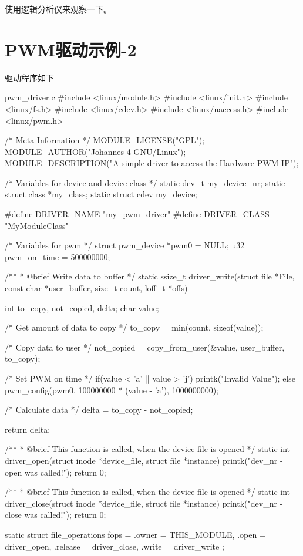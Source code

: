 \documentclass[lang=cn,newtx,10pt,scheme=chinese]{elegantbook}
\begin{document}
使用逻辑分析仪来观察一下。

\chapter{PWM驱动示例-2}

驱动程序如下

\begin{mycode}{pwm\_driver.c}
#include <linux/module.h>
#include <linux/init.h>
#include <linux/fs.h>
#include <linux/cdev.h>
#include <linux/uaccess.h>
#include <linux/pwm.h>

/* Meta Information */
MODULE_LICENSE("GPL");
MODULE_AUTHOR("Johannes 4 GNU/Linux");
MODULE_DESCRIPTION("A simple driver to access the Hardware PWM IP");

/* Variables for device and device class */
static dev_t my_device_nr;
static struct class *my_class;
static struct cdev my_device;

#define DRIVER_NAME "my_pwm_driver"
#define DRIVER_CLASS "MyModuleClass"

/* Variables for pwm  */
struct pwm_device *pwm0 = NULL;
u32 pwm_on_time = 500000000;

/**
 * @brief Write data to buffer
 */
static ssize_t driver_write(struct file *File, const char *user_buffer, size_t count, loff_t *offs) {
    int to_copy, not_copied, delta;
    char value;

    /* Get amount of data to copy */
    to_copy = min(count, sizeof(value));

    /* Copy data to user */
    not_copied = copy_from_user(&value, user_buffer, to_copy);

    /* Set PWM on time */
    if(value < 'a' || value > 'j')
        printk("Invalid Value\n");
    else
        pwm_config(pwm0, 100000000 * (value - 'a'), 1000000000);

    /* Calculate data */
    delta = to_copy - not_copied;

    return delta;
}

/**
 * @brief This function is called, when the device file is opened
 */
static int driver_open(struct inode *device_file, struct file *instance) {
    printk("dev_nr - open was called!\n");
    return 0;
}

/**
 * @brief This function is called, when the device file is opened
 */
static int driver_close(struct inode *device_file, struct file *instance) {
    printk("dev_nr - close was called!\n");
    return 0;
}

static struct file_operations fops = {
    .owner = THIS_MODULE,
    .open = driver_open,
    .release = driver_close,
    .write = driver_write
};


\end{mycode}
\end{document}
